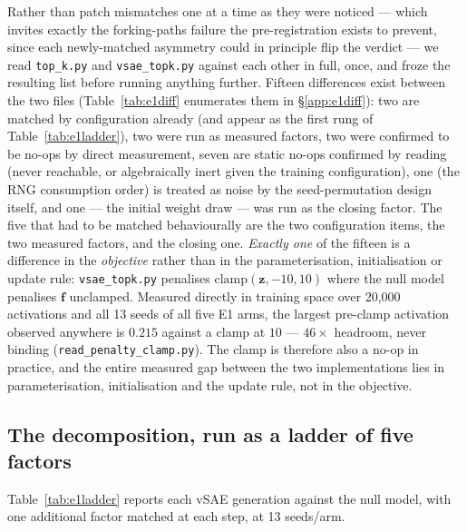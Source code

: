 \documentclass[11pt]{article}
\begin{document}
Rather than patch mismatches one at a time as they were noticed --- which
invites exactly the forking-paths failure the pre-registration exists to
prevent, since each newly-matched asymmetry could in principle flip the
verdict --- we read \texttt{top\_k.py} and \texttt{vsae\_topk.py} against each
other in full, once, and froze the resulting list before running anything
further. Fifteen differences exist between the two files (Table~\ref{tab:e1diff}
enumerates them in \S\ref{app:e1diff}): two are matched by configuration
already (and appear as the first rung of Table~\ref{tab:e1ladder}), two were
run as measured factors, two were confirmed to be no-ops by direct
measurement, seven are static no-ops confirmed by reading (never reachable,
or algebraically inert given the training configuration), one (the RNG
consumption order) is treated as noise by the seed-permutation design itself,
and one --- the initial weight draw --- was run as the closing factor. The
five that had to be matched behaviourally are the two configuration items,
the two measured factors, and the closing one. \emph{Exactly one} of the fifteen is a difference in the
\emph{objective} rather than in the parameterisation, initialisation or
update rule: \texttt{vsae\_topk.py} penalises
$\mathrm{clamp}(\mathbf{z},-10,10)$ where the null model penalises
$\mathbf{f}$ unclamped. Measured directly in training space over 20{,}000
activations and all 13 seeds of all five E1 arms, the largest pre-clamp
activation observed anywhere is $0.215$ against a clamp at $10$ ---
$46\times$ headroom, never binding (\texttt{read\_penalty\_clamp.py}). The clamp is
therefore also a no-op in practice, and the entire measured gap between the
two implementations lies in parameterisation, initialisation and the update
rule, not in the objective.

\subsection{The decomposition, run as a ladder of five factors}

Table~\ref{tab:e1ladder} reports each vSAE generation against the null model,
with one additional factor matched at each step, at 13 seeds/arm.
\end{document}
